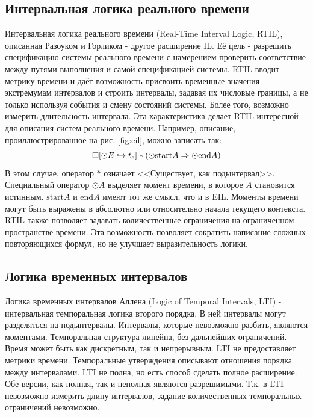 		\subsection{Интервальная логика реального времени}
		Интервальная логика реального времени (Real-Time Interval Logic, RTIL), описанная Разоуком и Горликом \cite{RTIL} - другое расширение IL.
		Её цель - разрешить спецификацию системы реального времени с намерением проверить соответствие между путями выполнения и самой спецификацией системы.
		RTIL вводит метрику времени и даёт возможность присвоить временные значения экстремумам интервалов и строить интервалы, задавая их числовые границы, а не только используя события и смену состояний системы.
		Более того, возможно измерить длительность интервала.
		Эта характеристика делает RTIL интересной для описания систем реального времени. Например, описание, проиллюстрированное на рис. \ref{fig:eil}, можно записать так: \[\square[\odot E \hookrightarrow t_e] * (\odot \text{start}A \Rightarrow
		 \odot \text{end} A) \]
		 В этом случае, оператор $ * $ означает <<Существует, как подынтервал>>.
		 Специальный оператор $ \odot A$ выделяет момент времени, в которое $ A $ становится истинным. 
		 $ \text{start} A$ и $ \text{end} A $ имеют тот же смысл, что и в EIL.
		 Моменты времени могут быть выражены в абсолютно или относительно начала текущего контекста.
		 RTIL также позволяет задавать количественные ограничения на ограниченном пространстве времени.
		 Эта возможность позволяет сократить написание сложных повторяющихся формул, но не улучшает выразительность логики.
		\subsection{Логика временных интервалов}
		Логика временных интервалов Аллена \cite{Allen} (Logic of Temporal Intervals, LTI) - интервальная темпоральная логика второго порядка.
		В ней интервалы могут разделяться на подынтервалы.
		Интервалы, которые невозможно разбить, являются моментами.
		Темпоральная структура линейна, без дальнейших ограничений.
		Время может быть как дискретным, так и непрерывным.
		LTI не предоставляет метрики времени.
		Темпоральные утверждения описывают отношения порядка между интервалами.
		LTI не полна, но есть способ сделать полное расширение.
		Обе версии, как полная, так и неполная являются разрешимыми.
		Т.к. в LTI невозможно измерить длину интервалов, задание количественных темпоральных ограничений невозможно.
		
